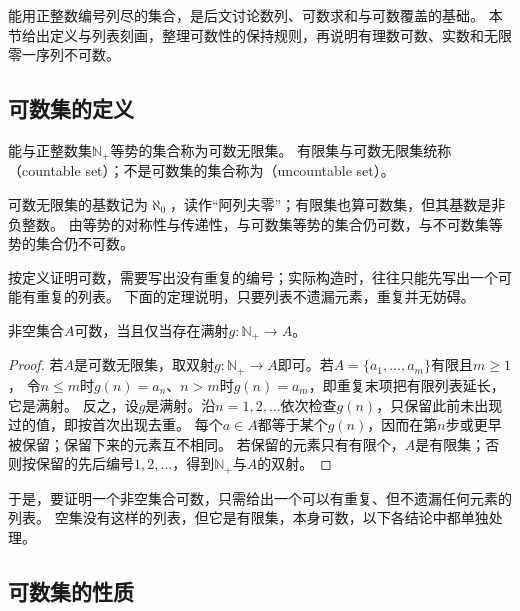 能用正整数编号列尽的集合，是后文讨论数列、可数求和与可数覆盖的基础。
本节给出定义与列表刻画，整理可数性的保持规则，再说明有理数可数、实数和无限零一序列不可数。

\subsection{可数集的定义}
\label{sec:countable-set-definition}

\begin{definition}[可数集]
\label{def:analysis-countable-set}
能与正整数集$\mathbb N_+$等势的集合称为可数无限集。
有限集与可数无限集统称（countable set）；不是可数集的集合称为（uncountable set）。
\end{definition}
可数无限集的基数记为$\aleph_0$，读作“阿列夫零”；有限集也算可数集，但其基数是非负整数。
由等势的对称性与传递性，与可数集等势的集合仍可数，与不可数集等势的集合仍不可数。

按定义证明可数，需要写出没有重复的编号；实际构造时，往往只能先写出一个可能有重复的列表。
下面的定理说明，只要列表不遗漏元素，重复并无妨碍。
\begin{theorem}[可数集的列表刻画]
\label{thm:comb-countable-surjection}
非空集合$A$可数，当且仅当存在满射$g:\mathbb N_+\to A$。
\end{theorem}
\begin{proof}
若$A$是可数无限集，取双射$g:\mathbb N_+\to A$即可。若$A=\{a_1,\ldots,a_m\}$有限且$m\geq1$，
令$n\leq m$时$g(n)=a_n$、$n>m$时$g(n)=a_m$，即重复末项把有限列表延长，它是满射。
反之，设$g$是满射。沿$n=1,2,\ldots$依次检查$g(n)$，只保留此前未出现过的值，即按首次出现去重。
每个$a\in A$都等于某个$g(n)$，因而在第$n$步或更早被保留；保留下来的元素互不相同。
若保留的元素只有有限个，$A$是有限集；否则按保留的先后编号$1,2,\ldots$，得到$\mathbb N_+$与$A$的双射。
\end{proof}
于是，要证明一个非空集合可数，只需给出一个可以有重复、但不遗漏任何元素的列表。
空集没有这样的列表，但它是有限集，本身可数，以下各结论中都单独处理。

\subsection{可数集的性质}
\label{sec:countable-set-properties}


